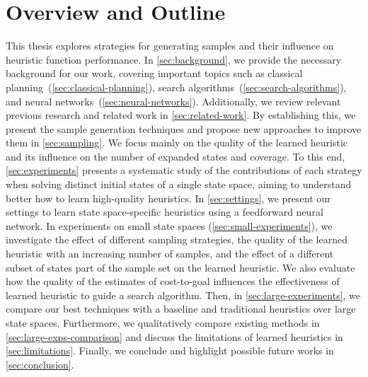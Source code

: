 \section{Overview and Outline}
\label{sec:outline}

This thesis explores strategies for generating samples and their influence on heuristic function performance. In \cref{sec:background}, we provide the necessary background for our work, covering important topics such as classical planning~(\cref{sec:classical-planning}), search algorithms~(\cref{sec:search-algorithms}), and neural networks~(\cref{sec:neural-networks}). Additionally, we review relevant previous research and related work in \cref{sec:related-work}. By establishing this, we present the sample generation techniques and propose new approaches to improve them in \cref{sec:sampling}. We focus mainly on the quality of the learned heuristic and its influence on the number of expanded states and coverage. To this end, \cref{sec:experiments} presents a systematic study of the contributions of each strategy when solving distinct initial states of a single state space, aiming to understand better how to learn high-quality heuristics. In \cref{sec:settings}, we present our settings to learn state space-specific heuristics using a feedforward neural network. In experiments on small state spaces (\cref{sec:small-experiments}), we investigate the effect of different sampling strategies, the quality of the learned heuristic with an increasing number of samples, and the effect of a different subset of states part of the sample set on the learned heuristic. We also evaluate how the quality of the estimates of cost-to-goal influences the effectiveness of learned heuristic to guide a search algorithm. Then, in \cref{sec:large-experiments}, we compare our best techniques with a baseline and traditional heuristics over large state spaces. Furthermore, we qualitatively compare existing methods in \cref{sec:large-exps-comparison} and discuss the limitations of learned heuristics in \cref{sec:limitations}. Finally, we conclude and highlight possible future works in \cref{sec:conclusion}.
